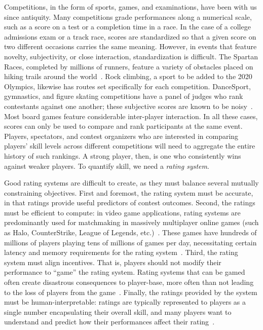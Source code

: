 Competitions, in the form of sports, games, and examinations, have been with us since antiquity. Many competitions grade performances along a numerical scale, such as a score on a test or a completion time in a race. In the case of a college admissions exam or a track race, scores are standardized so that a given score on two different occasions carries the same meaning. However, in events that feature novelty, subjectivity, or close interaction, standardization is difficult. The Spartan Races, completed by millions of runners, feature a variety of obstacles placed on hiking trails around the world~\cite{Spartan}. Rock climbing, a sport to be added to the 2020 Olympics, likewise has routes set specifically for each competition. DanceSport, gymnastics, and figure skating competitions have a panel of judges who rank contestants against one another; these subjective scores are known to be noisy~\cite{DanceSport}. Most board games feature considerable inter-player interaction.
In all these cases, scores can only be used to compare and rank participants at the same event. Players, spectators, and contest organizers who are interested in comparing players' skill levels across different competitions will need to aggregate the entire history of such rankings. A strong player, then, is one who consistently wins against weaker players. To quantify skill, we need a \emph{rating system}.

Good rating systems are difficult to create, as they must balance several mutually constraining objectives. First and foremost, the rating system must be accurate, in that ratings provide useful predictors of contest outcomes. Second, the ratings must be efficient to compute: in video game applications, rating systems are predominantly used for matchmaking in massively multiplayer online games (such as Halo, CounterStrike, League of Legends, etc.)~\cite{HMG06, MCZ18, Y14}. These games have hundreds of millions of players playing tens of millions of games per day, necessitating certain latency and memory requirements for the rating system~\cite{AL09}. Third, the rating system must align incentives. That is, players should not modify their performance to ``game'' the rating system. Rating systems that can be gamed often create disastrous consequences to player-base, more often than not leading to the loss of players from the game~\cite{pokemongo}. Finally, the ratings provided by the system must be human-interpretable: ratings are typically represented to players as a single number encapsulating their overall skill, and many players want to understand and predict how their performances affect their rating~\cite{G95}.

